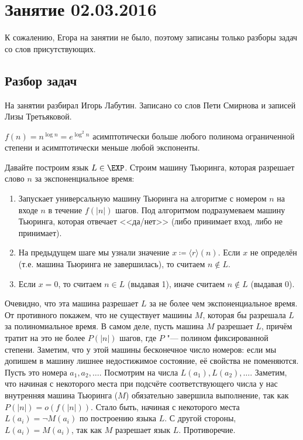 \chapter{Занятие 02.03.2016}

К сожалению, Егора на занятии не было, поэтому записаны только разборы задач
со слов присутствующих.

\section{Разбор задач}
\label{prob16}
	На занятии разбирал Игорь Лабутин.
	Записано со слов Пети Смирнова и записей Лизы Третьяковой.

	\begin{assertion}
		$f(n)=n^{\log n}=e^{\log^2 n}$ асимптотически больше любого полинома ограниченной степени
		и асимптотически меньше любой экспоненты.
	\end{assertion}
	Давайте построим язык $L \in \EXP$.
	Строим машину Тьюринга, которая разрешает слово $n$ за экспоненциальное время:
	\begin{enumerate}
		\item
			Запускает универсальную машину Тьюринга на алгоритме с номером $n$ на входе $n$ в течение $f(|n|)$ шагов.
			Под алгоритмом подразумеваем машину Тьюринга, которая отвечает <<да/нет>> (либо принимает вход, либо не принимает).
		\item
			На предыдущем шаге мы узнали значение $x \coloneq \langle r \rangle(n)$.
			Если $x$ не определён (т.е. машина Тьюринга не завершилась), то считаем $n \notin L$.
		\item
			Если $x=0$, то считаем $n \in L$ (выдавая 1), иначе считаем $n \notin L$ (выдавая 0).
	\end{enumerate}
	Очевидно, что эта машина разрешает $L$ за не более чем экспоненциальное время.
	От противного покажем, что не существует машины $M$, которая бы разрешала $L$ за полиномиальное время.
	В самом деле, пусть машина $M$ разрешает $L$, причём тратит на это не более $P(|n|)$ шагов,
	где $P$ "--- полином фиксированной степени.
	Заметим, что у этой машины бесконечное число номеров: если мы допишем в машину лишнее недостижимое состояние,
	её свойства не поменяются.
	Пусть это номера $a_1, a_2, \dots$.
	Посмотрим на числа $L(a_1), L(a_2), \dots$.
	Заметим, что начиная с некоторого места при подсчёте соответствующего числа у нас внутренняя машина Тьюринга ($M$)
	обязательно завершила выполнение, так как $P(|n|)=o(f(|n|))$.
	Стало быть, начиная с некоторого места $L(a_i)=\lnot M(a_i)$ по построению языка $L$.
	С другой стороны, $L(a_i)=M(a_i)$, так как $M$ разрешает язык $L$.
	Противоречие.

